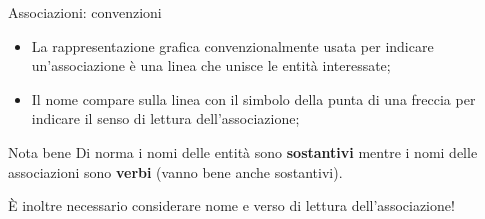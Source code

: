 %
\begin{frame}{Associazioni: convenzioni}

\begin{itemize}
    \item La rappresentazione grafica convenzionalmente usata per indicare un'associazione \`e una linea che unisce le entit\`a interessate;
    \item Il nome compare sulla linea con il simbolo della punta di una freccia per indicare il senso di lettura dell'associazione;
\end{itemize}
\pause
\begin{center}
\end{center}
\pause
\begin{block}{Nota bene}
    Di norma i nomi delle entit\`a sono \textbf{sostantivi} mentre i nomi delle associazioni sono \textbf{verbi} (vanno bene anche sostantivi).
    \pause

    \`E inoltre necessario considerare nome e verso di lettura dell'associazione!
\end{block}
\end{frame}
%
